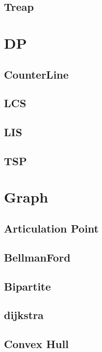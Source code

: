 \subsection{Treap}



\section{DP}

\subsection{CounterLine}

\subsection{LCS}

\subsection{LIS}

\subsection{TSP}


\section{Graph}
\subsection{Articulation Point}

\subsection{BellmanFord}

\subsection{Bipartite}

\subsection{dijkstra}

\subsection{Convex Hull}

